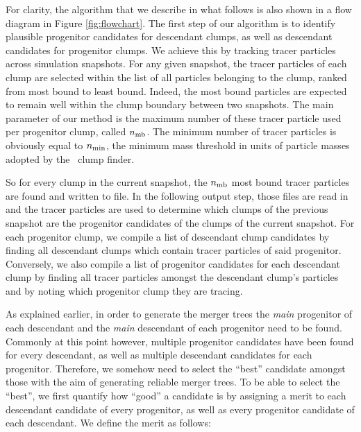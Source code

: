 For clarity, the algorithm that we describe in what follows
is also shown in a flow diagram in Figure \ref{fig:flowchart}.
The first step of our algorithm is to identify plausible progenitor
candidates for descendant clumps, as well as descendant candidates for progenitor clumps. We achieve this by tracking tracer particles
across simulation snapshots. For any given snapshot, the tracer particles
of each clump are selected within the list of all particles belonging to
the clump, ranked from most bound to least bound. Indeed, the most bound particles are expected to remain well within the clump boundary between
two snapshots. The main parameter of our method is the maximum number of
these tracer particle used per progenitor clump, called $n_{\rm mb}$. The minimum number of tracer particles is obviously equal to $n_{\rm min}$, the minimum mass threshold in units of particle masses adopted by the \phew\ clump finder.

So for every clump in the current snapshot, the $n_{\rm mb}$
most bound tracer particles are found and written to file. In the following
output step, those files are read in and the tracer particles
are used to determine which clumps of the previous snapshot are the
progenitor candidates of the clumps of the current snapshot.
For each progenitor clump, we compile a list of descendant clump candidates by finding all descendant clumps which contain tracer particles of said progenitor. Conversely, we also compile a list of progenitor candidates for each descendant clump by finding all tracer particles amongst the descendant clump's particles and by noting which progenitor clump they are tracing.

As explained earlier, in order to generate the merger trees the \textit{main} progenitor of each descendant and the \textit{main} descendant of each progenitor need to be found. Commonly at this point however, multiple progenitor candidates have been found for every descendant, as well as multiple descendant candidates for each progenitor. Therefore, we somehow need to select the ``best'' candidate amongst those with the aim of generating reliable merger trees. To be able to select the ``best'', we first quantify how ``good'' a candidate is by assigning a merit to each descendant candidate of every progenitor, as well as every progenitor candidate of each descendant. We define the merit as follows:

